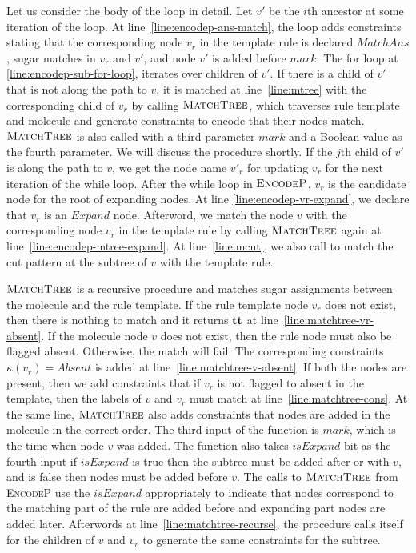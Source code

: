 Let us consider the body of the loop in detail.
Let $v'$ be the $i$th ancestor at some iteration of the loop.
At line~\ref{line:encodep-ans-match}, the loop adds constraints stating that the corresponding node $v_r$ in the template rule is
declared $MatchAns$, sugar matches in $v_r$ and $v'$, and
node $v'$ is added before $mark$.
The for loop at \ref{line:encodep-sub-for-loop}, iterates over
children of $v'$.
If there is a child of $v'$ that is not along the path to
$v$, it is matched at line~\ref{line:mtree} with the corresponding
child of $v_r$ by calling $\textsc{MatchTree}$, which traverses
rule template and molecule and generate constraints to encode that their
nodes match.
$\textsc{MatchTree}$ is also called with a third parameter
$mark$ and a Boolean value as the fourth parameter.
We will discuss the procedure shortly.
If the $j$th child of $v'$ is along the path to $v$,
we get the node name $v'_r$ for updating
$v_r$ for the next iteration of the while loop.
After the while loop in $\textsc{EncodeP}$, $v_r$ is the
candidate node for the root of expanding nodes.
At line \ref{line:encodep-vr-expand}, we declare that $v_r$
is an $Expand$ node.
Afterword, we match the node $v$
with the corresponding node $v_r$ in the template rule by calling
$\textsc{MatchTree}$ again at line~\ref{line:encodep-mtree-expand}.
At line~\ref{line:mcut}, we also call to match the cut pattern at
the subtree of $v$ with the template rule.

$\textsc{MatchTree}$ is a recursive procedure and matches
sugar assignments between the molecule and the rule template.
If the rule template node $v_r$ does not exist, then
there is nothing to match and it returns $\mathbf{tt}$ at
line~\ref{line:matchtree-vr-absent}.
If the molecule node $v$ does not exist, then the rule node must also
be flagged absent. Otherwise, the match will fail.
The corresponding constraints $\kappa(v_r) = Absent$ is added
at line~\ref{line:matchtree-v-absent}.
If both the nodes are present, then we add constraints
that if $v_r$ is not flagged to absent in the template, then
the labels of $v$ and $v_r$ must match at line~\ref{line:matchtree-cons}.
At the same line, $\textsc{MatchTree}$ also adds constraints that
nodes are added in the molecule in the correct order.
The third input of the function is $mark$, which is the time when
node $v$ was added. 
The function also takes $isExpand$ bit as the fourth input if
$isExpand$ is true then the subtree must be added after
or with $v$, and is
false then nodes must be added before $v$.
The calls to $\textsc{MatchTree}$ from \textsc{EncodeP} use the
$isExpand$ appropriately to indicate that nodes correspond to the
matching part of the rule are added before and expanding part nodes
are added later.
Afterwords at line~\ref{line:matchtree-recurse},
the procedure calls itself for the children of $v$ and $v_r$ to
generate the same constraints for the subtree.

